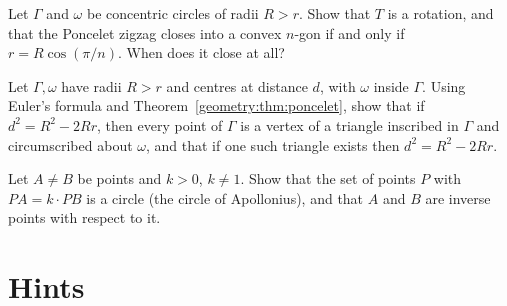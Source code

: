 \begin{exercise}[$\star$]\label{geometry:ex:concentric}
Let $\Gamma$ and $\omega$ be concentric circles of radii $R>r$. Show that $T$ is a rotation, and that the Poncelet zigzag closes into a convex $n$-gon
if and only if $r=R\cos(\pi/n)$. When does it close at all?
\end{exercise}

\begin{exercise}[$\star\star$]\label{geometry:ex:chappleeuler}
Let $\Gamma,\omega$ have radii $R>r$ and centres at distance $d$, with $\omega$ inside $\Gamma$. Using Euler's formula and Theorem~\ref{geometry:thm:poncelet},
show that if $d^2=R^2-2Rr$, then every point of $\Gamma$ is a vertex of a triangle inscribed in $\Gamma$ and circumscribed about $\omega$, and that if
one such triangle exists then $d^2=R^2-2Rr$.
\end{exercise}

\begin{exercise}[$\star$]\label{geometry:ex:apolloniuscircle}
Let $A\ne B$ be points and $k>0$, $k\ne1$. Show that the set of points $P$ with $PA=k\cdot PB$ is a circle (the circle of Apollonius), and that $A$ and
$B$ are inverse points with respect to it.
\end{exercise}

\section{Hints}


